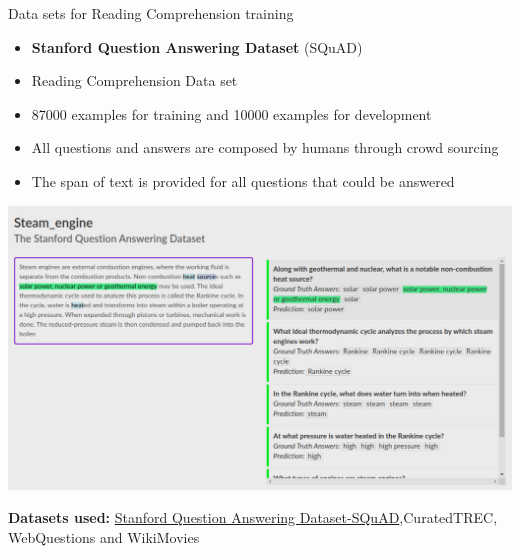 \begin{frame}[shrink]{Data sets for Reading Comprehension training}
    \begin{minipage}{0.4\linewidth}
        \begin{itemize}
            \item [] \textbf{Stanford Question Answering Dataset} (SQuAD)
            \item Reading Comprehension Data set
            \item 87000  examples  for  training and  10000 examples  for  development
            \item All questions and answers are composed by humans through crowd sourcing
            \item The span of text is provided for all questions that could be answered
        \end{itemize}
    \end{minipage}
    \begin{minipage}{0.55\linewidth}
        \includegraphics[width=1.15\linewidth]{"./Images/Squad-1"}

    \end{minipage}
    \vspace{0.5cm}
    \textbf{Datasets used:} \href{https://rajpurkar.github.io/SQuAD-explorer/explore/v2.0/dev/Steam_engine.html}{Stanford Question Answering Dataset-SQuAD},CuratedTREC,  WebQuestions and  WikiMovies
    \cite{wang2016machine}
\end{frame}

